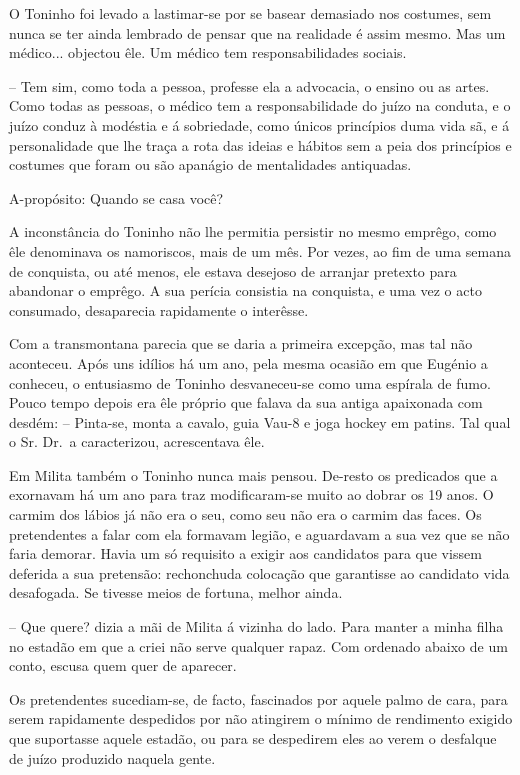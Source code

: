 \documentclass[9pt]{article}
\begin{document}
O Toninho foi levado a lastimar-se por se basear demasiado nos costumes, sem nunca se ter ainda lembrado de pensar que na realidade é assim mesmo. Mas um médico... objectou êle. Um médico tem responsabilidades sociais.

-- Tem sim, como toda a pessoa, professe ela a advocacia, o ensino ou as
artes. Como todas as pessoas, o médico tem a responsabilidade do juízo na
conduta, e o juízo conduz à modéstia e á sobriedade, como únicos princípios
duma vida sã, e á personalidade que lhe traça a rota das ideias e hábitos
sem a peia dos princípios e costumes que foram ou são apanágio de mentalidades antiquadas.

A-propósito: Quando se casa você?

A inconstância do Toninho não lhe permitia persistir no mesmo em\-prê\-go,
como êle denominava os namoriscos, mais de um mês. Por vezes, ao fim de uma
semana de conquista, ou até menos, ele estava desejoso de arranjar pretexto
para abandonar o em\-prê\-go. A sua perícia consistia na conquista, e uma vez
o acto consumado, desaparecia rapidamente o interêsse.

Com a transmontana parecia que se daria a primeira excep\-ção, mas tal
não aconteceu. Após uns idílios há um ano, pela mesma ocasião em que Eugé\-nio a conheceu, o
entusiasmo de Toninho desvaneceu-se como uma espírala de fumo. Pouco tempo
depois era êle próprio que falava da sua antiga apaixonada com desdém: -- Pinta-se, monta a cavalo, guia Vau-8 e joga hockey em patins. Tal qual o Sr.
Dr.\ a caracterizou, acrescentava êle.

Em Milita também o Toninho nunca mais pensou. De-resto os predicados
que a exornavam há um ano para traz modifi\-caram-se muito ao dobrar os 19
anos. O carmim dos lábios já não era o seu, como seu não era o carmim das
faces. Os pretendentes a falar com ela formavam legião, e aguardavam a sua
vez que se não faria demorar. Havia um só requisito a exigir aos candidatos para que vissem deferida a sua pretensão: rechonchuda coloca\-ção que
garantisse ao candidato vida desafogada. Se tivesse meios de fortuna, me\-lhor
ainda.

-- Que quere? dizia a mãi de Milita á vizinha do lado. Para manter a
minha fi\-lha no estadão em que a criei não serve qualquer rapaz. Com ordenado abaixo de um conto, escusa quem quer de aparecer.

Os pretendentes sucediam-se, de facto, fascinados por aquele palmo de
cara, para serem rapidamente despedidos por não atingirem o mí\-ni\-mo de rendimento exigido que suportasse aquele estadão, ou para se despedirem eles ao
verem o desfalque de juízo produzido naquela gente.
\end{document}
